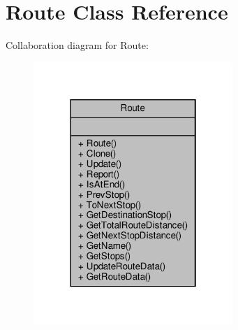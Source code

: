 \hypertarget{classRoute}{}\section{Route Class Reference}
\label{classRoute}


Collaboration diagram for Route\+:
\nopagebreak
\begin{figure}[H]
\begin{center}
\leavevmode
\includegraphics[width=214pt]{classRoute__coll__graph}
\end{center}
\end{figure}
